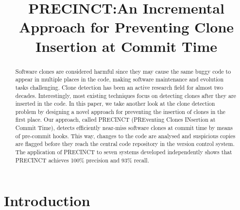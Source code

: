 \documentclass[conference]{IEEEtran}
\begin{document}
\title{PRECINCT:\@ An Incremental Approach for Preventing Clone Insertion at Commit Time}


\author{
\and
{}
}

\maketitle

\begin{abstract}
  Software clones are considered harmful since they may cause the same buggy code to appear in multiple places in the code, making software maintenance and evolution tasks challenging. Clone detection has been an active research field for almost two decades. Interestingly, most existing techniques focus on detecting clones after they are inserted in the code.  In this paper, we take another look at the clone detection problem by designing a novel approach for preventing the insertion of clones in the first place. Our approach, called PRECINCT (PREventing Clones INsertion at Commit Time),  detects efficiently  near-miss software clones at commit time by means of pre-commit hooks. This way, changes to the code are analysed and suspicious copies are flagged before they reach the central code repository in the version control system.  The application of PRECINCT to seven systems developed independently shows that PRECINCT achieves 100\% precision and 93\% recall.



\end{abstract}


\IEEEpeerreviewmaketitle

\section{Introduction}
\label{sec:Introduction}
\end{document}
